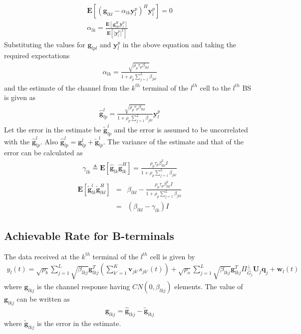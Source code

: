 \documentclass[10pt, a4paper, twoside,fleqn]{article}
\begin{document}
\begin{eqnarray}
	\pmb{E}[(\pmb{g}_{lkl}-\alpha_{lk}\pmb{y}_{l}^{p})^H \pmb{y}_{l}^{p}] = 0 \\
	\alpha_{lk} = \frac{\pmb{E}[\pmb{g}^{H}_{lkl} \pmb{y}_{l}^{p}]}{\pmb{E}[|\pmb{y}_{l}^{p}|^2]}
\end{eqnarray}
Substituting the values for $\pmb{g}_{lpl}$ and $\pmb{y}_{l}^{p}$ in the above equation and taking the required expectations
\begin{eqnarray}\label{eq:alphapll}
	\alpha_{lk}=\frac{\sqrt{\rho_p \tau_p \beta_{lkl}}}{1+\rho_p\sum\limits_{j=1}^{L}\beta_{jkl}}
\end{eqnarray}
and the estimate of the channel from the $k^{th}$ terminal of the $l^{th}$ cell to the $l^{th}$ BS is given as
\begin{eqnarray}\label{eq:estimatehpll}
	\pmb{\hat g}_{lp}^{l} = \frac{\sqrt{\rho_p\tau_p\beta_{lkl}}}{1+\rho_p\sum\limits_{j=1}^{L}\beta_{jkl}} \pmb{y}_{l}^{p}
\end{eqnarray}
Let the error in the estimate be ${\pmb{\widetilde{g}}_{lp}^{l}}$ and the error is assumed to be uncorrelated with the $\pmb{\hat g}_{lp}^{l}$. Also $\pmb{\hat g}_{lp}^{l}=\pmb{g}_{lp}^{l}+\pmb{\widetilde{g}}_{lp}^{l}$.
The variance of the estimate and that of the error can be calculated as
\begin{eqnarray}
	\gamma_{lk} \triangleq \pmb{E}[\pmb{\hat g}_{lk}\pmb{\hat g}^H_{lk}]
                    =       \frac{\rho_p\tau_p\beta^2_{lkl}I}{1+\rho_p\sum\limits_{j=1}^{L}\beta_{jkl}} 
\end{eqnarray}
\begin{eqnarray}
    \pmb{E}[\pmb{\widetilde{g}}_{lk}^{l} \pmb{\widetilde{g}}^H_{lkl}] &=& \beta_{lkl}- \frac{\rho_p\tau_p\beta^2_{lkl}I}{1+\rho_p\sum\limits_{j=1}^{L}\beta_{jkl}} \nonumber\\
          									    &=& (\beta_{lkl} - \gamma_{lk})I
\end{eqnarray}

\subsection{Achievable Rate for B-terminals}

The data received at the $k^{th}$ terminal of the $l^{th}$ cell is given by
\begin{eqnarray}\label{eq:ot}
 	y_{l}(t) = \sqrt{\rho_b}\sum_{j=1}^{L} \sqrt{\beta_{lkj}} \pmb{g}_{lkj}^{T} \left(\sum_{k'=1}^{K}\pmb{v}_{jk'}s_{jk'}(t)\right)
 		      + \sqrt{\rho_o}\sum_{j=1}^{L}\sqrt{\beta_{lkj}}\pmb{g}^T_{lkj} \Pi^{\perp}_{{\widehat{G}_j}} \pmb{U}_j\pmb{q}_{j}+ \pmb{w}_{l}(t)
\end{eqnarray}  
where  $\pmb{g}_{lkj}$ is the channel response having $CN(0,\beta_{lkj})$ elements. The value of $\pmb{g}_{lkj}$ can be written as
\begin{eqnarray}\label{eqn:gvect}
 \pmb{g}_{lkj} =  \pmb{\hat g}_{lkj} - \pmb{\widetilde{g}}_{lkj}
\end{eqnarray}
where  $\pmb{\widetilde{g}}_{lkj}$ is the error in the estimate.
\end{document}
